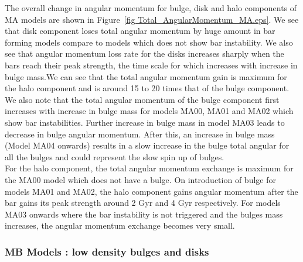 \documentclass[a4paper,fleqn,usenatbib,useAMS]{mnras}
\begin{document}
The overall change in angular momentum for bulge, disk and halo components of MA models are shown in Figure~\ref{fig Total_AngularMomentum_MA.eps}. 
We see that disk component loses total angular momentum by huge amount in bar forming models compare to models which does not show bar instability.
We also see that angular momentum loss rate for the disks increases sharply when the bars reach their peak strength, the time scale for which increases with increase in bulge mass.We can see that the total angular momentum gain is maximum for the halo component and is around 15 to 20 times that of the bulge component. \\ 
\indent  We also note that the total angular momentum of the bulge component first increases with increase in bulge mass for models MA00, MA01 and MA02 which show bar instabilities. Further increase in bulge mass in model MA03 leads to decrease in bulge angular momentum. After this, an  increase in bulge mass (Model MA04 onwards) results in a slow increase in the bulge total angular for all the bulges and could represent the slow spin up of bulges. \\                   
\indent For the halo component, the total angular momentum exchange is
maximum for the MA00 model which does not have a bulge. On introduction
of bulge for models MA01 and MA02, the halo component gains angular momentum after the bar gains its peak strength around 2 Gyr and 4 Gyr respectively. For models MA03 onwards where the  bar instability is not triggered and the bulges mass increases, the angular momentum exchange becomes very small.

\subsubsection{MB Models : low density bulges and disks}
\end{document}
